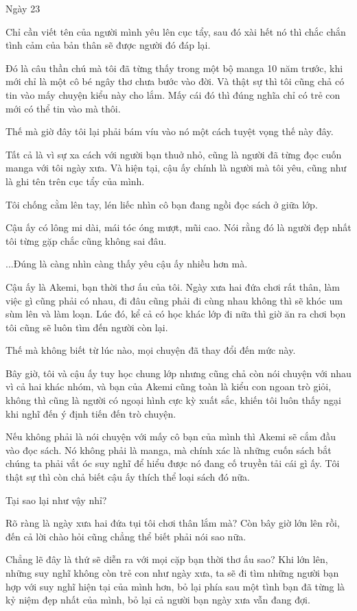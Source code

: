 {Ngày 23}
{
Chỉ cần viết tên của người mình yêu lên cục tẩy, sau đó xài hết nó thì
chắc chắn tình cảm của bản thân sẽ được người đó đáp lại.

Đó là câu thần chú mà tôi đã từng thấy trong một bộ manga 10 năm trước,
khi mới chỉ là một cô bé ngây thơ chưa bước vào đời. Và thật sự thì tôi
cũng chả có tin vào mấy chuyện kiểu này cho lắm. Mấy cái đó thì đúng
nghĩa chỉ có trẻ con mới có thể tin vào mà thôi.

Thế mà giờ đây tôi lại phải bám víu vào nó một cách tuyệt vọng thế này
đây.

Tất cả là vì sự xa cách với người bạn thuở nhỏ, cũng là người đã từng
đọc cuốn manga với tôi ngày xưa. Và hiện tại, cậu ấy chính là người mà
tôi yêu, cũng như là ghi tên trên cục tẩy của mình.

Tôi chống cằm lên tay, lén liếc nhìn cô bạn đang ngồi đọc sách ở giữa
lớp.

Cậu ấy có lông mi dài, mái tóc óng mượt, mũi cao. Nói rằng đó là người
đẹp nhất tôi từng gặp chắc cũng không sai đâu.

...Đúng là càng nhìn càng thấy yêu cậu ấy nhiều hơn mà.

Cậu ấy là Akemi, bạn thời thơ ấu của tôi. Ngày xưa hai đứa chơi rất
thân, làm việc gì cũng phải có nhau, đi đâu cũng phải đi cùng nhau không
thì sẽ khóc um sùm lên và làm loạn. Lúc đó, kể cả có học khác lớp đi nữa
thì giờ ăn ra chơi bọn tôi cũng sẽ luôn tìm đến người còn lại.

Thế mà không biết từ lúc nào, mọi chuyện đã thay đổi đến mức này.

Bây giờ, tôi và cậu ấy tuy học chung lớp nhưng cũng chả còn nói chuyện
với nhau vì cả hai khác nhóm, và bạn của Akemi cũng toàn là kiểu con
ngoan trò giỏi, không thì cũng là người có ngoại hình cực kỳ xuất sắc,
khiến tôi luôn thấy ngại khi nghĩ đến ý định tiến đến trò chuyện.

Nếu không phải là nói chuyện với mấy cô bạn của mình thì Akemi sẽ cắm
đầu vào đọc sách. Nó không phải là manga, mà chính xác là những cuốn
sách bắt chúng ta phải vắt óc suy nghĩ để hiểu được nó đang cố truyền
tải cái gì ấy. Tôi thật sự thì còn chả biết cậu ấy thích thể loại sách
đó nữa.

Tại sao lại như vậy nhỉ?

Rõ ràng là ngày xưa hai đứa tụi tôi chơi thân lắm mà? Còn bây giờ lớn
lên rồi, đến cả lời chào hỏi cũng chẳng thể biết phải nói sao nữa.

Chẳng lẽ đây là thứ sẽ diễn ra với mọi cặp bạn thời thơ ấu sao? Khi lớn
lên, những suy nghĩ không còn trẻ con như ngày xưa, ta sẽ đi tìm những
người bạn hợp với suy nghĩ hiện tại của mình hơn, bỏ lại phía sau một
tình bạn đã từng là kỷ niệm đẹp nhất của mình, bỏ lại cả người bạn ngày
xưa vẫn đang đợi.

}
